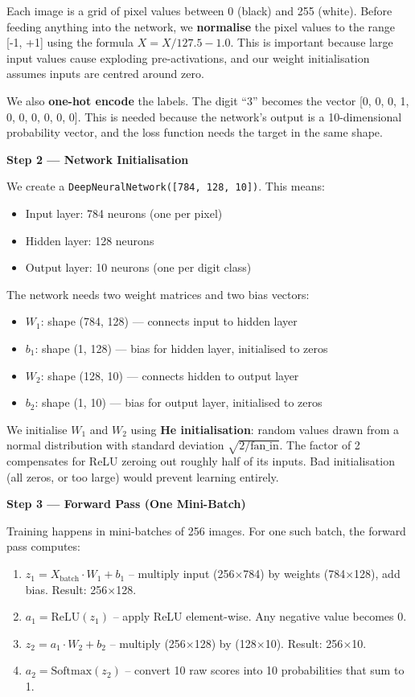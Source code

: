 \documentclass[12pt, a4paper]{article}
\begin{document}
Each image is a grid of pixel values between 0 (black) and 255 (white). Before feeding anything into the network, we \textbf{normalise} the pixel values to the range [-1, +1] using the formula $X = X / 127.5 - 1.0$. This is important because large input values cause exploding pre-activations, and our weight initialisation assumes inputs are centred around zero.

We also \textbf{one-hot encode} the labels. The digit ``3'' becomes the vector [0, 0, 0, 1, 0, 0, 0, 0, 0, 0]. This is needed because the network's output is a 10-dimensional probability vector, and the loss function needs the target in the same shape.

\textbf{Step 2 --- Network Initialisation}

We create a \texttt{DeepNeuralNetwork([784, 128, 10])}. This means:
\begin{itemize}
  \item Input layer: 784 neurons (one per pixel)
  \item Hidden layer: 128 neurons
  \item Output layer: 10 neurons (one per digit class)
\end{itemize}

The network needs two weight matrices and two bias vectors:
\begin{itemize}
  \item $W_1$: shape (784, 128) --- connects input to hidden layer
  \item $b_1$: shape (1, 128) --- bias for hidden layer, initialised to zeros
  \item $W_2$: shape (128, 10) --- connects hidden to output layer
  \item $b_2$: shape (1, 10) --- bias for output layer, initialised to zeros
\end{itemize}

We initialise $W_1$ and $W_2$ using \textbf{He initialisation}: random values drawn from a normal distribution with standard deviation $\sqrt{2 / \text{fan\_in}}$. The factor of 2 compensates for ReLU zeroing out roughly half of its inputs. Bad initialisation (all zeros, or too large) would prevent learning entirely.

\textbf{Step 3 --- Forward Pass (One Mini-Batch)}

Training happens in mini-batches of 256 images. For one such batch, the forward pass computes:

\begin{enumerate}
  \item $z_1 = X_{\text{batch}} \cdot W_1 + b_1$ \quad -- multiply input (256$\times$784) by weights (784$\times$128), add bias. Result: 256$\times$128.
  \item $a_1 = \text{ReLU}(z_1)$ \quad -- apply ReLU element-wise. Any negative value becomes 0.
  \item $z_2 = a_1 \cdot W_2 + b_2$ \quad -- multiply (256$\times$128) by (128$\times$10). Result: 256$\times$10.
  \item $a_2 = \text{Softmax}(z_2)$ \quad -- convert 10 raw scores into 10 probabilities that sum to 1.
\end{enumerate}
\end{document}
